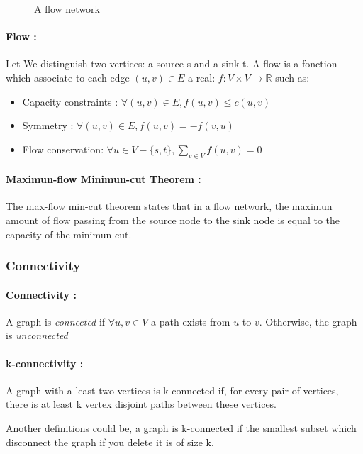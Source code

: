\begin{figure}[!h]
  \begin{center}
    
  \end{center}
  \caption{A flow network}
\end{figure}

\paragraph{Flow :}
Let We distinguish two vertices: a source s and a sink t.
A flow is a fonction which associate to each edge $(u,v) \in E$ a real: $f: V \times V \rightarrow \mathbb{R}$ such as:
\begin{itemize}
    \item Capacity constraints : $\forall (u,v) \in E, f(u,v) \leq c(u,v)$
    \item Symmetry : $\forall (u,v) \in E, f(u,v) = - f(v,u) $
    \item Flow conservation: $\forall u \in V - \{s,t\}, \sum_{v \in V}f(u,v) = 0$ 
\end{itemize}


\paragraph{Maximun-flow Minimun-cut Theorem :}
The max-flow min-cut theorem states that in a flow network, the maximun amount of flow passing from the source node to the sink node is equal to the capacity of the minimun cut.


\subsubsection{Connectivity}
\paragraph{Connectivity :}\label{defConnectivity}
A graph  is {\em connected} if $\forall u,v \in V$ a path exists from $u$
to $v$. Otherwise, the graph is {\em unconnected}

\paragraph{k-connectivity :}
A graph with a least two vertices is k-connected if, for every pair of vertices, there is at least k vertex disjoint paths between these vertices.

Another definitions could be, a graph is k-connected if the smallest subset which disconnect the graph if you delete it is of size k.


